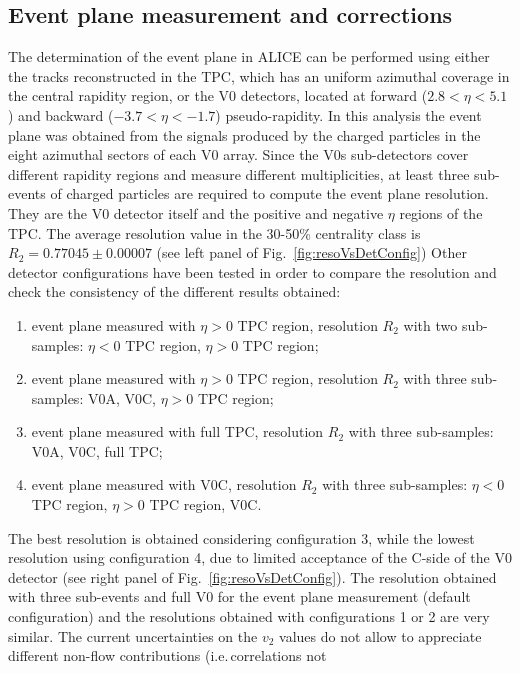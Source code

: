 \subsection{Event plane measurement and corrections}

The determination of the event plane in ALICE can be performed using
either the tracks reconstructed in the TPC, which has an uniform
azimuthal coverage in the central rapidity region, or the V0
detectors, located at forward ($2.8<\eta<5.1$) and backward
($-3.7<\eta<-1.7$) pseudo-rapidity.
In this analysis the event plane was obtained from the 
signals produced by the charged particles in the eight 
azimuthal sectors of each V0 array. Since the V0s sub-detectors cover different rapidity 
regions and measure different multiplicities, at least 
three sub-events of charged particles are required to 
compute the event plane resolution.
They are the V0 detector itself and the 
positive and negative $\eta$ regions of the TPC.
The average resolution value in the 30-50\% centrality class is
$R_2 = 0.77045 \pm 0.00007$ (see left panel 
of Fig.~\ref{fig:resoVsDetConfig}) 
Other detector 
configurations have been tested in order to compare 
the resolution and check the consistency of the different 
results obtained:
\begin{enumerate}
\item event plane measured with $\eta > 0$ TPC region,  
resolution $R_2$ with two sub-samples: $\eta < 0$ TPC region, 
$\eta > 0$ TPC region;
\item event plane measured with $\eta > 0$ TPC region,  
resolution $R_2$ with three sub-samples: V0A, V0C, $\eta > 0$ TPC region; 
\item event plane measured with full TPC,  
resolution $R_2$ with three sub-samples: V0A, V0C, full TPC; 
\item event plane measured with V0C,  
resolution $R_2$ with three sub-samples:  $\eta < 0$ TPC region, $\eta > 0$ TPC region, V0C.
\end{enumerate}
The best resolution is obtained considering configuration 3, 
while the lowest resolution using configuration 4, due to
limited acceptance of the C-side of the V0 detector (see right panel 
of Fig.~\ref{fig:resoVsDetConfig}). 
The resolution obtained with three sub-events and full V0 for the event
plane measurement (default configuration) and the 
resolutions obtained with configurations 1 or 2 are very similar. 
The current uncertainties on the $v_2$ values do not allow to
appreciate different non-flow contributions (i.e.\,correlations not 
